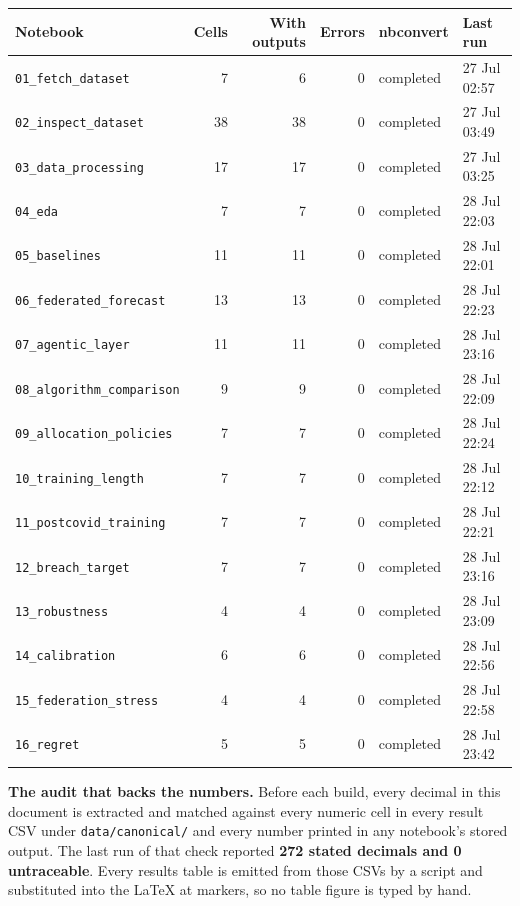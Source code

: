 \documentclass[11pt,a4paper]{article}
\newcommand{\keypoint}[1]{%
  \par\vspace{0.4em}%
  \noindent\colorbox{fed!8}{\parbox{0.98\textwidth}{\vspace{0.2em}#1\vspace{0.2em}}}%
  \par\vspace{0.4em}}
\begin{document}
\begin{center}
\footnotesize
\begin{tabular}{@{}lrrrll@{}}
\toprule
\textbf{Notebook} & \textbf{Cells} & \textbf{With outputs} & \textbf{Errors} & \textbf{nbconvert} & \textbf{Last run} \\
\midrule
\texttt{01\_fetch\_dataset} & 7 & 6 & 0 & completed & 27 Jul 02:57 \\
\texttt{02\_inspect\_dataset} & 38 & 38 & 0 & completed & 27 Jul 03:49 \\
\texttt{03\_data\_processing} & 17 & 17 & 0 & completed & 27 Jul 03:25 \\
\texttt{04\_eda} & 7 & 7 & 0 & completed & 28 Jul 22:03 \\
\texttt{05\_baselines} & 11 & 11 & 0 & completed & 28 Jul 22:01 \\
\texttt{06\_federated\_forecast} & 13 & 13 & 0 & completed & 28 Jul 22:23 \\
\texttt{07\_agentic\_layer} & 11 & 11 & 0 & completed & 28 Jul 23:16 \\
\texttt{08\_algorithm\_comparison} & 9 & 9 & 0 & completed & 28 Jul 22:09 \\
\texttt{09\_allocation\_policies} & 7 & 7 & 0 & completed & 28 Jul 22:24 \\
\texttt{10\_training\_length} & 7 & 7 & 0 & completed & 28 Jul 22:12 \\
\texttt{11\_postcovid\_training} & 7 & 7 & 0 & completed & 28 Jul 22:21 \\
\texttt{12\_breach\_target} & 7 & 7 & 0 & completed & 28 Jul 23:16 \\
\texttt{13\_robustness} & 4 & 4 & 0 & completed & 28 Jul 23:09 \\
\texttt{14\_calibration} & 6 & 6 & 0 & completed & 28 Jul 22:56 \\
\texttt{15\_federation\_stress} & 4 & 4 & 0 & completed & 28 Jul 22:58 \\
\texttt{16\_regret} & 5 & 5 & 0 & completed & 28 Jul 23:42 \\
\bottomrule
\end{tabular}
\end{center}

\keypoint{\textbf{The audit that backs the numbers.} Before each build, every decimal in this document
is extracted and matched against every numeric cell in every result CSV under
\texttt{data/canonical/} and every number printed in any notebook's stored output. The last run of that
check reported \textbf{272 stated decimals and 0 untraceable}. Every results table is emitted from
those CSVs by a script and substituted into the LaTeX at markers, so no table figure is typed by hand.}
\end{document}

